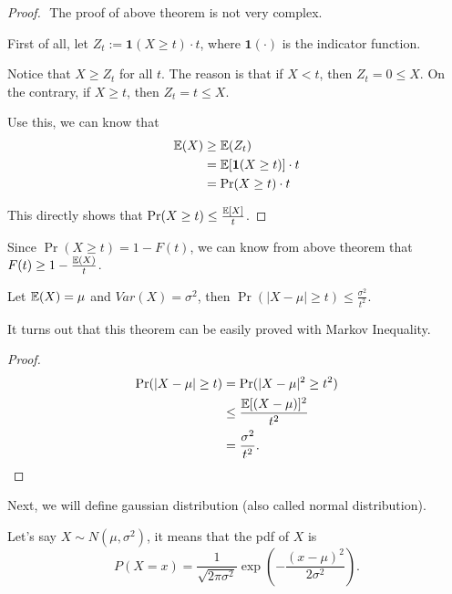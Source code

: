 \documentclass[../main.tex]{subfiles}
\begin{document}
\begin{proof}$ $
	The proof of above theorem is not very complex.
	
	First of all, let $Z_t := \mathbf{1}(X\geq t)\cdot t$, where $\mathbf{1}(\cdot)$ is the indicator function.
	
	Notice that $X \geq Z_t$ for all $t$. The reason is that if $X < t$, then $Z_t = 0 \leq X$. On the contrary, if $X\geq t$, then $Z_t = t \leq X$.
	
	Use this, we can know that
	\begin{equation*}
		\begin{aligned}
			\mathbb{E}(X) & \geq \mathbb{E}(Z_t) \\
					& = \mathbb{E}[\mathbf{1}(X \geq t)]\cdot t \\
					& = \Pr(X\geq t)\cdot t 
		\end{aligned}
	\end{equation*}
	
	This directly shows that $\Pr(X \geq t)\leq \frac{\mathbb{E}[X]}{t}$.
\end{proof}

Since $\Pr(X\geq t) = 1 - F(t)$, we can know from above theorem that $F(t) \geq 1 - \frac{\mathbb{E}(X)}{t} $.

\begin{theorem}
	Let $\mathbb{E}(X) = \mu$ and $Var(X) = \sigma^2$, then $\Pr(|X - \mu| \geq t) \leq \frac{\sigma^2}{t^2}$.
\end{theorem}

It turns out that this theorem can be easily proved with Markov Inequality.
\begin{proof}
	\begin{equation*}
		\begin{aligned}
			\Pr(|X - \mu| \geq t) &= \Pr(|X -\mu|^2 \geq t^2) \\
			& \leq \frac{\mathbb{E}[(X-\mu)]^2}{t^2} \\
			& = \frac{\sigma^2}{t^2}.
		\end{aligned}
	\end{equation*}
\end{proof}

Next, we will define gaussian distribution (also called normal distribution).

\begin{theorem}
	Let's say $X \sim N(\mu, \sigma^2)$, it means that the pdf of $X$ is 
		\begin{equation*}
			P(X = x) = \frac{1}{\sqrt{2\pi\sigma^2}} \exp(-\frac{(x-\mu)^2}{2\sigma^2}).
		\end{equation*}
\end{theorem}
\end{document}
